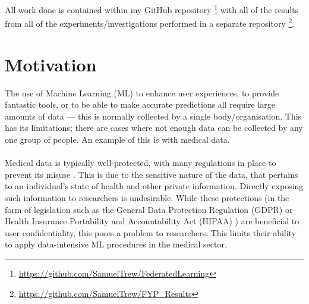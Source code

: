 All work done is contained within my GitHub repository \footnote{\href{https://github.com/SamuelTrew/FederatedLearning}{https://github.com/SamuelTrew/FederatedLearning}} with all of the results from all of the experiments/investigations performed in a separate repository \footnote{\href{https://github.com/SamuelTrew/FYP_Results}{https://github.com/SamuelTrew/FYP\_Results}}.

\section{Motivation}
The use of Machine Learning (ML) to enhance user experiences, to provide fantastic tools, or to be able to make accurate predictions all require large amounts of data --- this is normally collected by a single body/organisation.
This has its limitations; there are cases where not enough data can be collected by any one group of people. 
An example of this is with medical data.
\\ \\
Medical data is typically well-protected, with many regulations in place to prevent its misuse \cite{nhs_digital_data}.  
This is due to the sensitive nature of the data, that pertains to an individual's state of health and other private information.
Directly exposing such information to researchers is undesirable. 
While these protections (in the form of legislation such as the General Data Protection Regulation (GDPR) \cite{gdpr} or Health Insurance Portability and Accountability Act (HIPAA) \cite{hipaa}) are beneficial to user confidentiality, this poses a problem to researchers. 
This limits their ability to apply data-intensive ML procedures in the medical sector.\\

